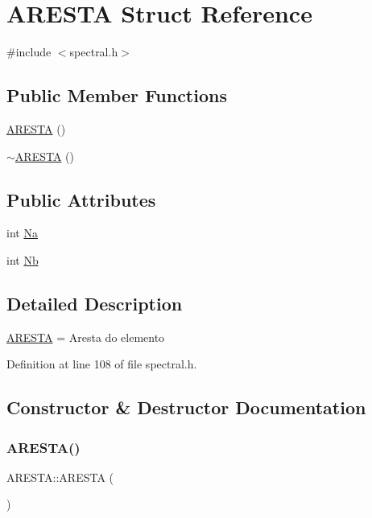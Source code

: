 \hypertarget{structARESTA}{}\section{A\+R\+E\+S\+TA Struct Reference}
\label{structARESTA}


{\ttfamily \#include $<$spectral.\+h$>$}

\subsection*{Public Member Functions}
\begin{DoxyCompactItemize}
\item 
\hyperlink{structARESTA_a542d4be3bbd7212797d1f3242d77bf1e}{A\+R\+E\+S\+TA} ()
\item 
\hyperlink{structARESTA_a349803b7ca02126d64a1ebc0aac40e45}{$\sim$\+A\+R\+E\+S\+TA} ()
\end{DoxyCompactItemize}
\subsection*{Public Attributes}
\begin{DoxyCompactItemize}
\item 
int \hyperlink{structARESTA_a0fc059fd8adea074928f975cf03ac1fc}{Na}
\item 
int \hyperlink{structARESTA_a868b061b4a37cb972790ed3f5ec6c45a}{Nb}
\end{DoxyCompactItemize}


\subsection{Detailed Description}
\hyperlink{structARESTA}{A\+R\+E\+S\+TA} = Aresta do elemento 

Definition at line 108 of file spectral.\+h.



\subsection{Constructor \& Destructor Documentation}
\mbox{\label{structARESTA_a542d4be3bbd7212797d1f3242d77bf1e}} 
\subsubsection{\texorpdfstring{A\+R\+E\+S\+T\+A()}{ARESTA()}}
{\footnotesize\ttfamily A\+R\+E\+S\+T\+A\+::\+A\+R\+E\+S\+TA (\begin{DoxyParamCaption}{ }\end{DoxyParamCaption})\hspace{0.3cm}{\ttfamily [inline]}}



